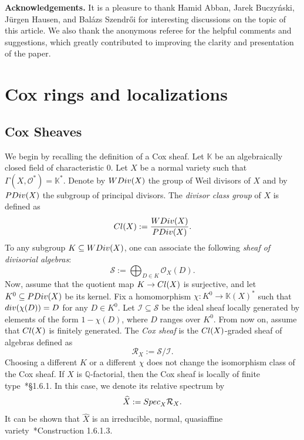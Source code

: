 \documentclass{amsart}
\theoremstyle{definition}
\theoremstyle{remark}
\begin{document}
\vspace{3mm}

{\bf Acknowledgements.}
It is a pleasure to thank Hamid Abban, Jarek Buczy\'nski, J\"urgen Hausen, and Bal\'azs Szendr\H{o}i for interesting discussions on the topic of this article.
We also thank the anonymous referee for the helpful comments and suggestions, which greatly contributed to improving the clarity and presentation of the paper.

\section{Cox rings and localizations}
\label{sec:cox-ring-embedded}

\subsection{Cox Sheaves}
We begin by recalling the definition of a Cox sheaf.
Let $\mathbb{K}$ be an algebraically closed field of characteristic $0$.
Let $X$ be a normal variety such that $\Gamma(X,\mathcal{O}^*) = \mathbb{K}^*$.
Denote by ${\rm WDiv}(X)$ the group of Weil divisors of $X$ and by ${\rm PDiv}(X)$ the subgroup of principal divisors.
The {\em divisor class group} of $X$ is defined as
\[
 {\rm Cl}(X) := \frac{{\rm WDiv}(X)}{{\rm PDiv}(X)}.
\]
To any subgroup $K \subseteq {\rm WDiv}(X)$, one can associate the following {\em sheaf of divisorial algebras}:
\[
 \mathcal{S} := \bigoplus_{D \in K} \mathcal{O}_X(D).
\]
Now, assume that the quotient map $K \to {\rm Cl}(X)$ is surjective, and let $K^0 \subseteq {\rm PDiv}(X)$ be its kernel.
Fix a homomorphism $\chi \colon K^0 \to \mathbb{K}(X)^*$ such that ${\rm div}(\chi(D)) = D$ for any $D \in K^0$.
Let $\mathcal{I} \subseteq \mathcal{S}$ be the ideal sheaf locally generated by elements of the form $1 - \chi(D)$, where $D$ ranges over $K^0$.
From now on, assume that ${\rm Cl}(X)$ is finitely generated.
The {\em Cox sheaf} is the ${\rm Cl}(X)$-graded sheaf of algebras defined as
\[
 \mathcal{R}_X := \mathcal{S} / \mathcal{I}.
\]
Choosing a different $K$ or a different $\chi$ does not change the isomorphism class of the Cox sheaf.
If $X$ is $\mathbb{Q}$-factorial, then the Cox sheaf is locally of finite type~\cite{adhl}*{\S 1.6.1}.
In this case, we denote its relative spectrum by
\[
 \widehat{X} := {\rm Spec}_X \mathcal{R}_X.
\]
It can be shown that $\widehat{X}$ is an irreducible, normal, quasiaffine variety~\cite{adhl}*{Construction 1.6.1.3}.
\end{document}
